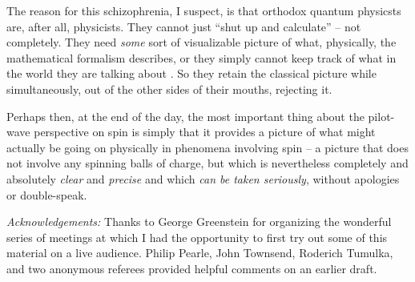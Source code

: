\documentclass[aps,prc,onecolumn,letterpaper,floatfix,12pt]{revtex4}
\begin{document}
The reason for this schizophrenia, I suspect, is that orthodox quantum 
physicsts are, after all, physicists.  They cannot just ``shut up and calculate'' --
not completely.  They need \emph{some} sort of visualizable picture of
what, physically, the mathematical formalism describes, or they simply
cannot keep track of what in the world they are talking about \cite{picture}.  
So they retain the classical picture while simultaneously, out of the other
sides of their mouths, rejecting it.  

Perhaps then, at the end of the day, the most important thing about
the pilot-wave perspective on spin is simply that it provides a
picture of what might actually be going on physically in
phenomena involving spin -- a
picture that does not involve any spinning balls of charge, but which
is nevertheless completely and absolutely \emph{clear} and
\emph{precise} and which \emph{can be taken seriously}, without
apologies or double-speak. 
 
\noindent
\emph{Acknowledgements:} Thanks to George Greenstein for organizing the wonderful series of
meetings at which I had the opportunity to first try out some of this
material on a live audience.  Philip Pearle, John Townsend, Roderich
Tumulka, and two anonymous referees provided helpful  comments on an
earlier draft.  
\end{document}
